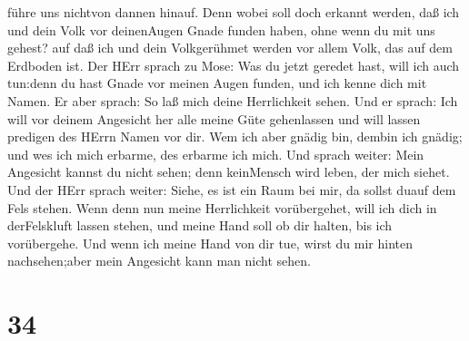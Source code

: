 führe uns nichtvon dannen hinauf.  Denn wobei soll doch
erkannt werden, daß ich und dein Volk vor deinenAugen Gnade funden
haben, ohne wenn du mit uns gehest? auf daß ich und dein Volkgerühmet
werden vor allem Volk, das auf dem Erdboden ist.  Der HErr
sprach zu Mose: Was du jetzt geredet hast, will ich auch tun:denn du
hast Gnade vor meinen Augen funden, und ich kenne dich mit Namen.
 Er aber sprach: So laß mich deine Herrlichkeit sehen.
 Und er sprach: Ich will vor deinem Angesicht her alle
meine Güte gehenlassen und will lassen predigen des HErrn Namen vor dir.
Wem ich aber gnädig bin, dembin ich gnädig; und wes ich mich erbarme,
des erbarme ich mich.  Und sprach weiter: Mein Angesicht
kannst du nicht sehen; denn keinMensch wird leben, der mich siehet.
 Und der HErr sprach weiter: Siehe, es ist ein Raum bei
mir, da sollst duauf dem Fels stehen.  Wenn denn nun meine
Herrlichkeit vorübergehet, will ich dich in derFelskluft lassen stehen,
und meine Hand soll ob dir halten, bis ich vorübergehe. 
Und wenn ich meine Hand von dir tue, wirst du mir hinten nachsehen;aber
mein Angesicht kann man nicht sehen.

\hypertarget{section-33}{%
\section{34}\label{section-33}}

